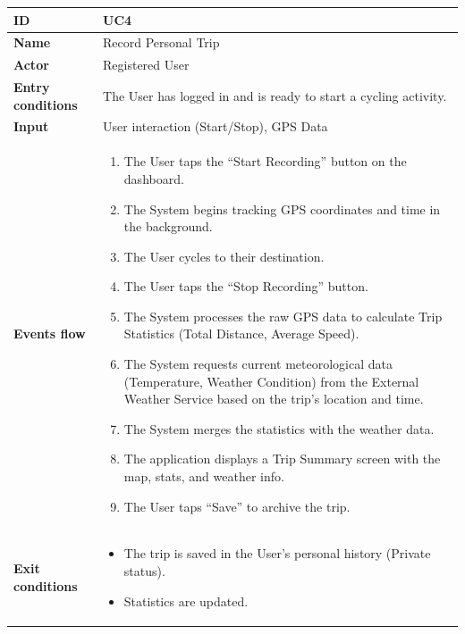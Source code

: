 \begin{table}[H]
\centering
\begin{tabularx}{\textwidth}{|m{3.5cm}|X|}
\hline
\textbf{ID} & UC4 \\ \hline
\textbf{Name} & Record Personal Trip \\ \hline
\textbf{Actor} & Registered User \\ \hline
\textbf{Entry conditions} & The User has logged in and is ready to start a cycling activity. \\ \hline
\textbf{Input} & User interaction (Start/Stop), GPS Data \\ \hline
\textbf{Events flow} & 
    \begin{enumerate}[nosep, leftmargin=*, before=\vspace{0.3em}, after=\vspace{0.3em}]
        \item The User taps the ``Start Recording'' button on the dashboard.
        \item The System begins tracking GPS coordinates and time in the background.
        \item The User cycles to their destination.
        \item The User taps the ``Stop Recording'' button.
        \item The System processes the raw GPS data to calculate Trip Statistics (Total Distance, Average Speed).
        \item The System requests current meteorological data (Temperature, Weather Condition) from the External Weather Service based on the trip's location and time.
        \item The System merges the statistics with the weather data.
        \item The application displays a Trip Summary screen with the map, stats, and weather info.
        \item The User taps ``Save'' to archive the trip.
    \end{enumerate} 
    \\ \hline
\textbf{Exit conditions} & 
    \begin{itemize}[nosep, leftmargin=*, before=\vspace{0.3em}, after=\vspace{0.3em}]
        \item The trip is saved in the User's personal history (Private status).
        \item Statistics are updated.
    \end{itemize}

\end{tabularx}
\end{table}
